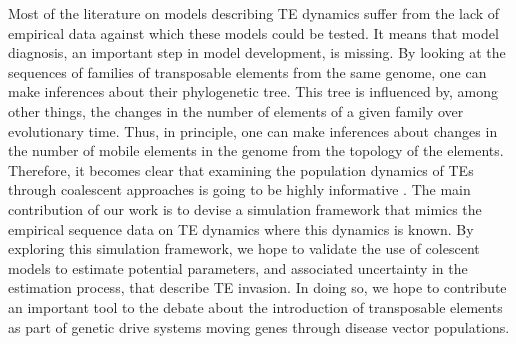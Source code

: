 \documentclass{bioinfo}
\begin{document}
Most of the literature on models describing TE dynamics suffer from
the lack of empirical data against which these models could be %
tested. It means that model diagnosis, an important step in model
development, is missing. By looking at the sequences of families of
transposable elements from the same genome, one can make inferences
about their phylogenetic tree. This tree is influenced by, among other
things, the changes in the number of elements of a given family over
evolutionary time. Thus, in principle, one can make inferences about
changes in the number of mobile elements in the genome from the
topology of the elements. Therefore, it becomes clear that examining
the population dynamics of TEs through coalescent approaches is going
to be highly informative \citep{Bro05,BJ06,SMT+09}. The main
contribution of our work is to devise a simulation framework that
mimics the empirical sequence data on TE dynamics where this dynamics
is known. By exploring this simulation framework, we hope to validate
the use of colescent models to estimate potential parameters, and
associated uncertainty in the estimation process, that describe TE
invasion. In doing so, we hope to contribute an important tool to the
debate about the introduction of transposable elements as part of
genetic drive systems moving genes through disease vector populations.

\end{document}
